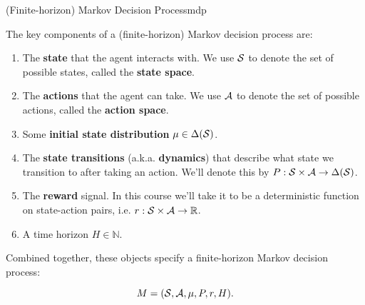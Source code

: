\documentclass[../main/main]{subfiles}
\begin{document}
\begin{definition}{(Finite-horizon) Markov Decision Process}{mdp}

The key components of a (finite-horizon) Markov decision process are:

\begin{enumerate}
    \item The \textbf{state} that the agent interacts with. We use $\S$ to denote the set of possible states, called the \textbf{state space}.
    \item The \textbf{actions} that the agent can take. We use $\A$ to denote the set of possible actions, called the \textbf{action space}.
    \item Some \textbf{initial state distribution} $\mu \in \Delta(\S)$.
    \item The \textbf{state transitions} (a.k.a. \textbf{dynamics}) that describe what state we transition to after taking an action. We'll denote this by $P : \S \times \A \to \Delta(\S)$. %
    \item The \textbf{reward} signal. In this course we'll take it to be a deterministic function on state-action pairs, i.e. $r : \S \times \A \to \mathbb{R}$. %
    \item A time horizon $H \in \mathbb{N}$.
\end{enumerate}

Combined together, these objects specify a finite-horizon Markov decision process:

\[
    M = (\S, \A, \mu, P, r, H).
\]

\end{definition}

\end{document}
